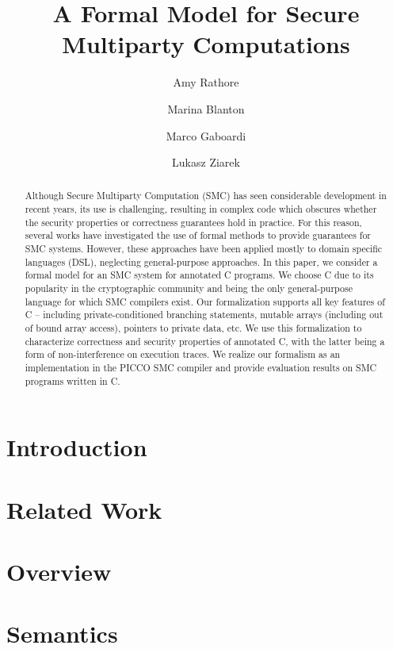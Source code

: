 \documentclass[11pt]{article}
\title{A Formal Model for Secure Multiparty Computations}
\date{}
\author[1]{Amy Rathore}
\author[1]{Marina Blanton}
\author[2]{Marco Gaboardi}
\author[1]{Lukasz Ziarek}
\affil[1]{Department of Computer Science and Engineering, University at Buffalo}
\affil[2]{Department of Computer Science, Boston University}
\begin{document}
\lstset{language=C, basicstyle=\footnotesize\ttfamily, numbers=left, numbersep=5pt, tabsize=2,mathescape=true}

\maketitle

\begin{abstract}
Although Secure Multiparty Computation (SMC) has seen considerable development in recent years, its use is challenging, resulting in complex code which obscures whether the security properties or correctness guarantees hold in practice. 
For this reason, several works have investigated the use of formal methods  to provide guarantees for
SMC systems. However, these approaches have been 
applied mostly to domain specific languages (DSL),
neglecting general-purpose approaches. 
In this paper, we consider a formal
model for an SMC system for  annotated C programs. 
We choose C due to its popularity
in the cryptographic community and being the only general-purpose language
for which SMC compilers exist.
Our formalization supports all
key features of C -- including private-conditioned branching statements, mutable arrays
(including out of bound array access), pointers to private data, etc. 
We use this formalization to  characterize correctness and security properties of annotated C, with the
latter being a form of non-interference on execution traces.  We realize our formalism as an implementation in the PICCO SMC compiler and provide
evaluation results on SMC programs written in C.
\end{abstract}

\section{Introduction} \label{Sec: Introduction}


\section{Related Work}


\section{Overview}
\label{sec:background}


\section{Semantics} \label{Sec: Semantics}

\end{document}
